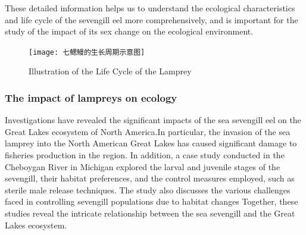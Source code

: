 \documentclass[CTeX = true]{mcmthesis}  %
\begin{document}
 These detailed information helps us to understand the ecological characteristics and life cycle of the sevengill eel more comprehensively, and is important for the study of the impact of its sex change on the ecological environment.

\begin{figure}[htbp]
       \centering    
   \texttt{[image: 七鳃鳗的生长周期示意图]}
     \caption{Illustration of the Life Cycle of the Lamprey}
     \label{fig:Illustration of the Life Cycle of the Lamprey}
\end{figure}

\subsubsection*{The impact of lampreys on ecology}
Investigations have revealed the significant impacts of the sea sevengill eel on the Great Lakes ecosystem of North America\cite{DangGuanchao2022}.In particular, the invasion of the sea lamprey into the North American Great Lakes has caused significant damage to fisheries production in the region. In addition, a case study conducted in the Cheboygan River in Michigan explored the larval and juvenile stages of the sevengill, their habitat preferences, and the control measures employed, such as sterile male release techniques. The study also discusses the various challenges faced in controlling sevengill populations due to habitat changes Together, these studies reveal the intricate relationship between the sea sevengill and the Great Lakes ecosystem\cite{JOHNSON2021S492}.
\end{document}
